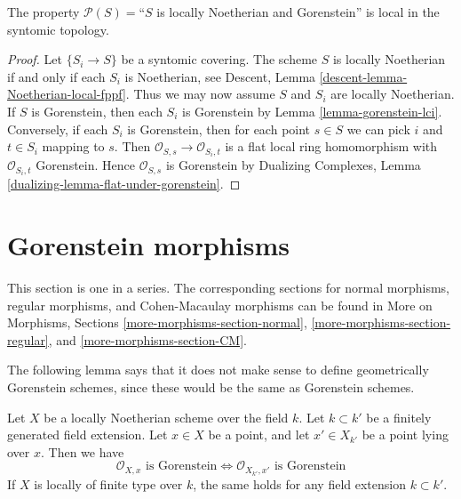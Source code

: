 \begin{lemma}
\label{lemma-gorenstein-local-syntomic}
The property $\mathcal{P}(S) =$``$S$ is locally Noetherian and Gorenstein''
is local in the syntomic topology.
\end{lemma}

\begin{proof}
Let $\{S_i \to S\}$ be a syntomic covering. The scheme $S$ is locally
Noetherian if and only if each $S_i$ is Noetherian, see
Descent, Lemma \ref{descent-lemma-Noetherian-local-fppf}.
Thus we may now assume $S$ and $S_i$ are locally Noetherian.
If $S$ is Gorenstein, then
each $S_i$ is Gorenstein by Lemma \ref{lemma-gorenstein-lci}.
Conversely, if each $S_i$ is Gorenstein, then for each point
$s \in S$ we can pick $i$ and $t \in S_i$ mapping to $s$.
Then $\mathcal{O}_{S, s} \to \mathcal{O}_{S_i, t}$
is a flat local ring homomorphism with $\mathcal{O}_{S_i, t}$
Gorenstein. Hence $\mathcal{O}_{S, s}$ is Gorenstein by
Dualizing Complexes, Lemma \ref{dualizing-lemma-flat-under-gorenstein}.
\end{proof}






\section{Gorenstein morphisms}
\label{section-gorenstein-morphisms}

\noindent
This section is one in a series. The corresponding sections for
normal morphisms,
regular morphisms, and
Cohen-Macaulay morphisms
can be found in More on Morphisms, Sections
\ref{more-morphisms-section-normal},
\ref{more-morphisms-section-regular}, and
\ref{more-morphisms-section-CM}.

\medskip\noindent
The following lemma says that it does not make sense to define
geometrically Gorenstein schemes, since these would be the
same as Gorenstein schemes.

\begin{lemma}
\label{lemma-gorenstein-base-change}
Let $X$ be a locally Noetherian scheme over the field $k$.
Let $k \subset k'$ be a finitely generated field extension.
Let $x \in X$ be a point, and let $x' \in X_{k'}$ be a point lying
over $x$. Then we have
$$
\mathcal{O}_{X, x}\text{ is Gorenstein}
\Leftrightarrow
\mathcal{O}_{X_{k'}, x'}\text{ is Gorenstein}
$$
If $X$ is locally of finite type over $k$, the same holds for any
field extension $k \subset k'$.
\end{lemma}

